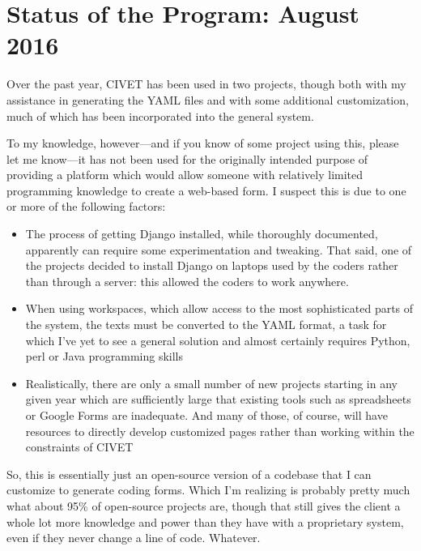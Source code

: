 \documentclass[letterpaper,10pt,english]{sphinxmanual}
\begin{document}
\section{Status of the Program: August 2016}
\label{intro:status-of-the-program-august-2016}
Over the past year, CIVET has been used in two projects, though both with
my assistance in generating the YAML files and with some additional
customization, much of which has been incorporated into the general
system.

To my knowledge, however—and if you know of some project using this,
please let me know—it has not been used for the originally intended
purpose of providing a platform which would allow someone with relatively
limited programming knowledge to create a web-based form. I suspect this
is due to one or more of the following factors:
\begin{itemize}
\item {} 
The process of getting Django installed, while thoroughly documented,
apparently can require some experimentation and tweaking. That
said, one of the projects decided to install Django on laptops
used by the coders rather than through a server: this
allowed the coders to work anywhere.

\item {} 
When using workspaces, which allow access to the most sophisticated
parts of the system, the texts must be converted to the YAML
format, a task for which I've yet to see a general solution and
almost certainly requires Python, perl or Java programming skills

\item {} 
Realistically, there are only a small number of new projects starting in any given
year which are sufficiently large that existing tools such as
spreadsheets or Google Forms are inadequate. And many of those,
of course, will have resources to directly develop customized
pages rather than working within the constraints of CIVET

\end{itemize}

So, this is essentially just an open-source version of a codebase that
I can customize to generate coding forms. Which I'm realizing is
probably pretty much what about 95\% of open-source projects are, though
that still gives the client a whole lot more knowledge and power than
they have with a proprietary system, even if they never change a line
of code. Whatever.
\end{document}
